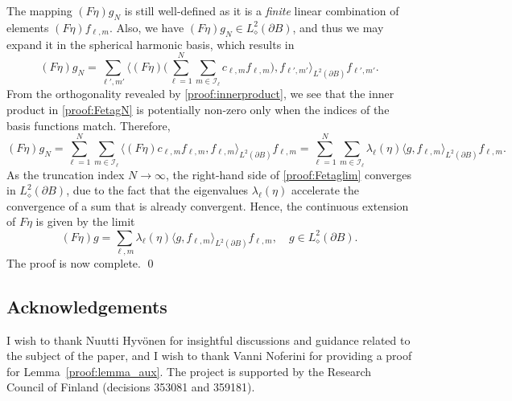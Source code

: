 \documentclass[reqno]{amsart}
\numberwithin{equation}{section}
\numberwithin{figure}{section}
\numberwithin{table}{section}
\theoremstyle{plain}
\theoremstyle{definition}
\theoremstyle{remark}
\newcommand{\inner}[1]{\langle#1\rangle}
\newcommand{\sphe}{{\partial B}}
\begin{document}
The mapping \( (F \eta) g_N \) is still well-defined as it is a \emph{finite} linear combination of elements \( (F \eta) f_{\ell, m} \).
%
Also, we have \( (F \eta) g_N \in L^2_\diamond(\sphe) \), and thus we may expand it in the spherical harmonic basis, which results in
%
\begin{equation} \label{proof:FetagN}
    (F \eta) g_N = \sum_{\ell', m'} \Big\langle (F \eta) \Big(\sum^N_{\ell=1} \sum_{m \in \mathcal{I_\ell}} c_{\ell, m} f_{\ell, m} \Big), f_{\ell',m'}  \Big\rangle_{L^2(\sphe)} f_{\ell', m'}.
\end{equation}
%
From the orthogonality revealed by \eqref{proof:innerproduct}, we see that the inner product in \eqref{proof:FetagN} is potentially non-zero only when the indices of the basis functions match.
%
Therefore,
%
\begin{equation} \label{proof:Fetaglim}
    (F \eta) g_N = \sum^N_{\ell = 1} \sum_{m \in \mathcal{I_\ell}} \langle (F \eta) c_{\ell, m} f_{\ell, m}, f_{\ell, m} \rangle_{L^2(\sphe)} f_{\ell, m}
    = \sum^N_{\ell = 1} \sum_{m \in \mathcal{I_\ell}} \lambda_\ell(\eta) \inner{g, f_{\ell, m}}_{L^2(\sphe)} f_{\ell, m}.
\end{equation}
%
As the truncation index \( N \to \infty \), the right-hand side of \eqref{proof:Fetaglim} converges in \( L^2_\diamond(\sphe) \), due to the fact that the eigenvalues \( \lambda_\ell(\eta) \) accelerate the convergence of a sum that is already convergent.
%
Hence, the continuous extension of \( F \eta \) is given by the limit
%
\[ (F \eta) g =  \sum_{\ell, m} \lambda_\ell(\eta) \inner{g, f_{\ell, m}}_{L^2(\sphe)} f_{\ell, m}, \quad g \in L^2_\diamond(\sphe). \]
%
The proof is now complete.
%
\hfill \qed
%


\subsection*{Acknowledgements}

    
	I wish to thank Nuutti Hyv\"onen for insightful discussions and guidance related to the subject of the paper, and I wish to thank Vanni Noferini for providing a proof for Lemma~\ref{proof:lemma_aux}.
    The project is supported by the Research Council of Finland (decisions 353081 and 359181).
\end{document}
